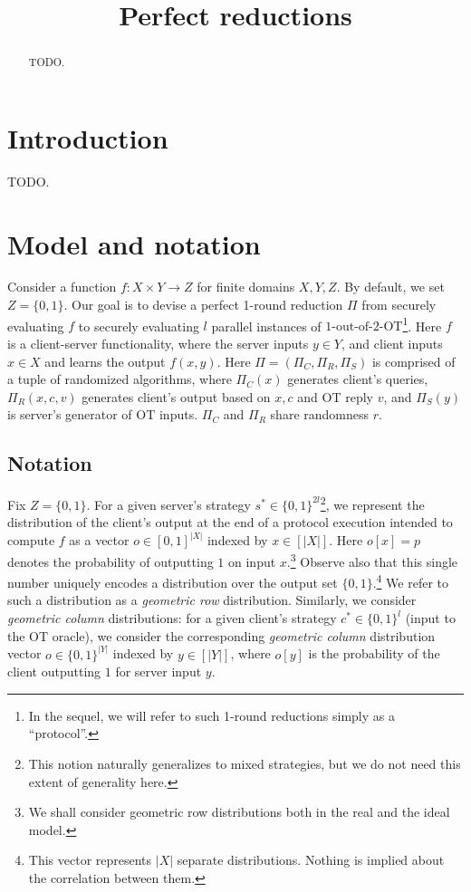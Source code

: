 \documentclass[a4paper]{article}
\title{Perfect reductions}
\newcommand{\OT}[2]{#1\text{-out-of-}#2\text{-OT}}
\begin{document}
\maketitle

\begin{abstract}
TODO.
\end{abstract}

\section{Introduction}

TODO.
\section{Model and notation}

Consider a function $f:X\times Y\rightarrow Z$ for finite domains $X,Y,Z$. By default, we set $Z=\{0,1\}$. Our goal is to devise a perfect 1-round reduction $\Pi$ from securely evaluating $f$ to securely evaluating $l$ parallel instances of $\OT{1}{2}$\footnote{In the sequel, we will refer to such 1-round reductions simply as a ``protocol''.}. Here $f$ is a client-server functionality, where the server inputs $y\in Y$, and client inputs $x\in X$ and learns the output $f(x,y)$. Here $\Pi=(\Pi_C,\Pi_R,\Pi_S)$ is comprised of a tuple of randomized algorithms, where $\Pi_C(x)$ generates client's queries, $\Pi_R(x,c,v)$ generates client's output based on $x,c$ and OT reply $v$, and $\Pi_S(y)$ is server's generator of OT inputs. $\Pi_C$ and $\Pi_R$ share randomness $r$.

\subsection{Notation} 
Fix $Z=\{0,1\}$. For a given server's strategy $s^*\in\{0,1\}^{2l}$\;\footnote{This notion naturally generalizes to mixed strategies, but we do not need this extent of generality here.}, we represent the distribution of the client's output at the end of a protocol execution intended to compute $f$ as a vector $o\in [0,1]^{|X|}$ indexed by $x\in [|X|]$. Here $o[x]=p$ denotes the probability of outputting $1$ on input $x$.\footnote{We shall consider geometric row distributions both in the real and the ideal model.}
Observe also that this single number uniquely encodes a distribution over the output set $\{0,1\}$.\footnote{This vector represents $|X|$ separate distributions. Nothing is implied about the correlation between them.} We refer to such a distribution as a \emph{geometric row} distribution. Similarly, we consider \emph{geometric column} distributions: for a given client's strategy $c^*\in\{0,1\}^l$ (input to the OT oracle), we consider the corresponding \emph{geometric column} distribution vector $o\in \{0,1\}^{|Y|}$ indexed by  $y\in [|Y|]$, where $o[y]$ is the probability of the client outputting $1$ for server input $y$.
\end{document}
